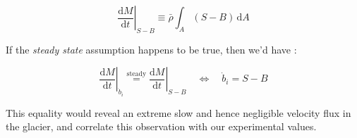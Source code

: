 \begin{equation}\left. \frac{\mathrm{d} M}{\mathrm{d}t} \right|_{S-B} \equiv \bar{\rho} \int_A (S-B) \, \mathrm{d}A\end{equation}

If the \textit{steady state} assumption happens to be true, then we'd have :

\begin{equation}\left. \frac{\mathrm{d} M}{\mathrm{d}t} \right|_{\dot{b}_i} \stackrel{\text{steady}}{=} \left. \frac{\mathrm{d} M}{\mathrm{d}t} \right|_{S-B}
\quad
\Leftrightarrow
\quad
\boxed{\dot{b}_i = S-B}
\end{equation}

This equality would reveal an extreme slow and hence negligible velocity flux in the glacier, and correlate this observation with our experimental values.